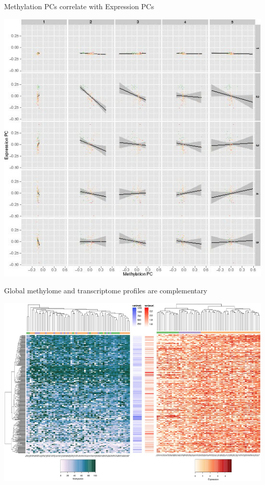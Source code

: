 \documentclass[10pt, compress]{beamer}
\renewcommand{\(}{\begin{columns}}
\renewcommand{\)}{\end{columns}}
\newcommand{\<}[1]{\begin{column}{#1}}
\renewcommand{\>}{\end{column}}
\begin{document}
\begin{frame}[fragile]
	\centering\large{Methylation PCs correlate with Expression PCs }
	\vspace*{-10pt}
	\begin{center}
		
		\includegraphics[width=\linewidth,height=\textheight,keepaspectratio]{images/pca2}
	\end{center}
\end{frame}
	
\begin{frame}[fragile]
	\centering\large{Global methylome and transcriptome profiles are complementary}
	\vspace*{-10pt}
	\begin{center}
		\includegraphics[width=\linewidth,height=\textheight,keepaspectratio]{images/clustering}
	\end{center}
\end{frame}
\end{document}
